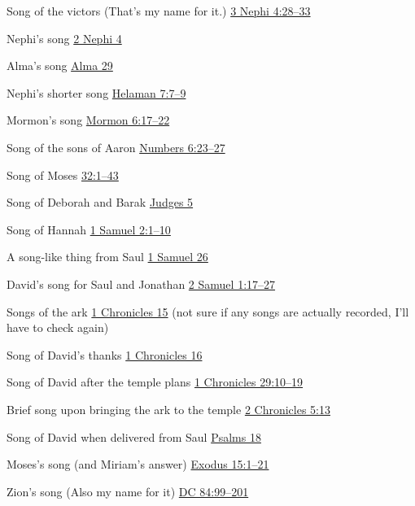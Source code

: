 		\begin{compactdesc}
			\item[Song of the victors] (That's my name for it.) \hyperref[3NEPHI-4-28]{3 Nephi 4:28--33}
			\item[Nephi's song] \hyperref[2NEPHI-4]{2 Nephi 4}
			\item[Alma's song] \hyperref[ALMA-29]{Alma 29}
			\item[Nephi's shorter song] \hyperref[HELAMAN-7-7]{Helaman 7:7--9}
			\item[Mormon's song] \hyperref[MORMON-6-17]{Mormon 6:17--22}
			\item[Song of the sons of Aaron] \hyperref[NUMBERS-6-23]{Numbers 6:23--27}
			\item[Song of Moses] \hyperref[DEUTERONOMY-32-1]{32:1--43}
			\item[Song of Deborah and Barak] \hyperref[JUDGES-5]{Judges 5}
			\item[Song of Hannah] \hyperref[1SAMUEL-2-1]{1 Samuel 2:1--10}
			\item[A song-like thing from Saul] \hyperref[1SAMUEL-26]{1 Samuel 26}
			\item[David's song for Saul and Jonathan] \hyperref[2SAMUEL-1-17]{2 Samuel 1:17--27}
			\item[Songs of the ark] \hyperref[1CHRONICLES-15]{1 Chronicles 15} (not sure if any songs are actually recorded, I'll have to check again)
			\item[Song of David's thanks] \hyperref[1CHRONICLES-16]{1 Chronicles 16}
			\item[Song of David after the temple plans] \hyperref[1CHRONICLES-29-10]{1 Chronicles 29:10--19}
			\item[Brief song upon bringing the ark to the temple] \hyperref[2CHRONICLES-5-13]{2 Chronicles 5:13}
			\item[Song of David when delivered from Saul] \hyperref[PSALMS-18]{Psalms 18}
			\item[Moses's song (and Miriam's answer)] \hyperref[EXODUS-15-1]{Exodus 15:1--21}
			\item[Zion's song] (Also my name for it) \hyperref[DC84-99]{DC 84:99--201}
		\end{compactdesc}